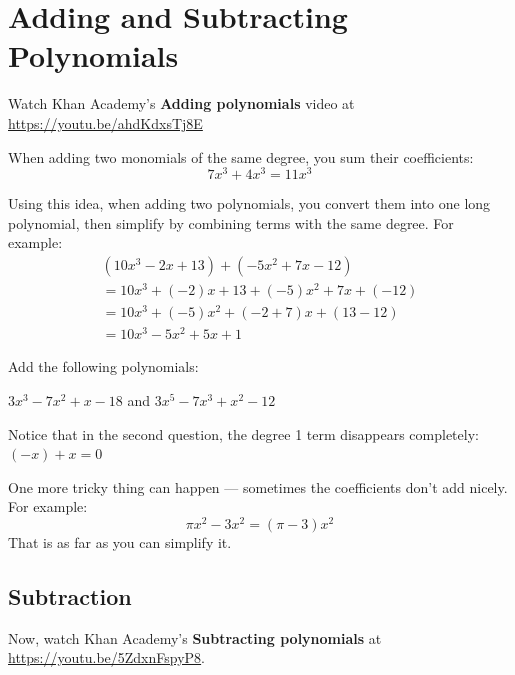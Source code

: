 \chapter{Adding and Subtracting Polynomials}

Watch Khan Academy's \textbf{Adding polynomials} video at \url{https://youtu.be/ahdKdxsTj8E}

When adding two monomials of the same degree, you sum their coefficients:
\begin{equation*}
  7x^3 + 4x^3 = 11x^3
\end{equation*}

Using this idea, when adding two polynomials, you convert them into one long
polynomial, then simplify by combining terms with the same degree. For example:
\begin{multline*}
  (10x^3 - 2x + 13) + (-5x^2 + 7x -12) \\
  = 10x^3 + (-2)x + 13 + (-5)x^2 + 7x + (-12) \\
  = 10x^3 + (-5)x^2 + (-2 + 7)x + (13 - 12) \\
  = 10x^3 - 5x^2 + 5x + 1
\end{multline*}

\begin{Exercise}[title=Adding Polynomials Practice, label=addpns]
  Add the following polynomials:
  \vspace{20mm}
  \vspace{20mm}
\end{Exercise}
\begin{Answer}[ref=addpns]$3x^3 - 7x^2 + x - 18$ and $3x^5 - 7x^3 + x^2 - 12$\end{Answer}

Notice that in the second question, the degree 1 term disappears completely: $(-x) + x = 0$

One more tricky thing can happen --- sometimes the coefficients don't add nicely.  For example:
\begin{equation*}
  \pi x^2 - 3 x^2 = (\pi - 3) x^2
\end{equation*}
That is as far as you can simplify it.
    
\section{Subtraction}
Now, watch Khan Academy's \textbf{Subtracting polynomials} at \url{https://youtu.be/5ZdxnFspyP8}.

